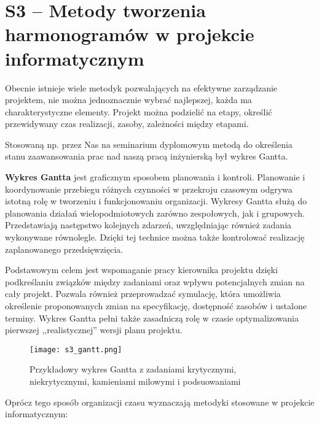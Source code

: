 \section{S3 -- Metody tworzenia harmonogramów w projekcie informatycznym}
Obecnie istnieje wiele metodyk pozwalających na efektywne zarządzanie projektem, nie można jednoznacznie wybrać najlepszej, każda ma charakterystyczne elementy. Projekt można podzielić na etapy, określić przewidywany czas realizacji, zasoby, zależności między etapami.

Stosowaną np. przez Nas na seminarium dyplomowym metodą do określenia stanu zaawansowania prac nad naszą pracą inżynierską był wykres Gantta.

\textbf{Wykres Gantta} jest graficznym sposobem planowania i kontroli. Planowanie i koordynowanie przebiegu różnych czynności w przekroju czasowym odgrywa istotną rolę w tworzeniu i funkcjonowaniu organizacji. Wykresy Gantta służą do planowania działań wielopodmiotowych zarówno zespołowych, jak i grupowych. Przedstawiają następstwo kolejnych zdarzeń, uwzględniając również zadania wykonywane równolegle. Dzięki tej technice można także kontrolować realizację zaplanowanego przedsięwzięcia.

Podstawowym celem jest wspomaganie pracy kierownika projektu dzięki podkreślaniu związków między zadaniami oraz wpływu potencjalnych zmian na cały projekt. Pozwala również przeprowadzać symulację, która umożliwia określenie proponowanych zmian na specyfikację, dostępność zasobów i ustalone terminy. Wykres Gantta pełni także zasadniczą rolę w czasie optymalizowania pierwszej ,,realistycznej” wersji planu projektu.

\begin{figure}[H]
	\centering
	\texttt{[image: s3\_gantt.png]}
	\caption{Przykładowy wykres Gantta z zadaniami krytycznymi, niekrytycznymi, kamieniami milowymi i podsuowaniami}
\end{figure}

Oprócz tego sposób organizacji czasu wyznaczają metodyki stosowane w projekcie informatycznym:

